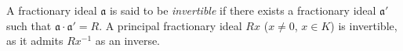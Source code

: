 A fractionary ideal $\mathfrak{a}$ is said to be \textit{invertible} if there exists a fractionary ideal $\mathfrak{a}'$ such that $\mathfrak{a} \cdot \mathfrak{a}' = R$. A principal fractionary ideal $Rx$ ($x \neq 0$, $x \in K$) is invertible, as it admits $Rx^{-1}$ as an inverse.
